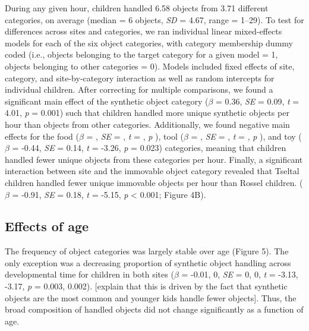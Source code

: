 \documentclass[10pt, letterpaper]{article}
\begin{document}
During any given hour, children handled 6.58 objects from 3.71 different
categories, on average (median = 6 objects, \emph{SD} = 4.67, range =
1--29). To test for differences across sites and categories, we ran
individual linear mixed-effects models for each of the six object
categories, with category membership dummy coded (i.e., objects
belonging to the target category for a given model = 1, objects
belonging to other categories = 0). Models included fixed effects of
site, category, and site-by-category interaction as well as random
intercepts for individual children. After correcting for multiple
comparisons, we found a significant main effect of the synthetic object
category (\(\beta\) = 0.36, \emph{SE} = 0.09, \emph{t} = 4.01, \emph{p}
= 0.001) such that children handled more unique synthetic objects per
hour than objects from other categories. Additionally, we found negative
main effects for the food (\(\beta\) = , \emph{SE} = , \emph{t} = ,
\emph{p} ), tool (\(\beta\) = , \emph{SE} = , \emph{t} = , \emph{p} ),
and toy (\(\beta\) = -0.44, \emph{SE} = 0.14, \emph{t} = -3.26, \emph{p}
= 0.023) categories, meaning that children handled fewer unique objects
from these categories per hour. Finally, a significant interaction
between site and the immovable object category revealed that Tseltal
children handled fewer unique immovable objects per hour than Rossel
children. (\(\beta\) = -0.91, \emph{SE} = 0.18, \emph{t} = -5.15,
\emph{p} \textless{} 0.001; Figure 4B).

\hypertarget{effects-of-age}{%
\subsection{Effects of age}\label{effects-of-age}}

The frequency of object categories was largely stable over age (Figure
5). The only exception was a decreasing proportion of synthetic object
handling across developmental time for children in both sites (\(\beta\)
= -0.01, 0, \emph{SE} = 0, 0, \emph{t} = -3.13, -3.17, \emph{p} = 0.003,
0.002). {[}explain that this is driven by the fact that synthetic
objects are the most common and younger kids handle fewer objects{]}.
Thus, the broad composition of handled objects did not change
significantly as a function of age.
\end{document}
